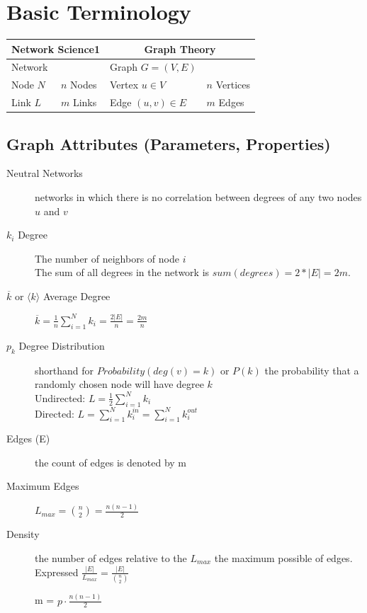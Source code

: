 \documentclass[../main.tex]{subfiles}
\begin{document}
\section{Basic Terminology}
\begin{table}
\centering

\begin{tabular}{|l|l|l|l|}
\hline
\multicolumn{2}{|c|}{\textbf{Network Science1}}& \multicolumn{2}{|c|}{\textbf{Graph Theory}}\\
\hline

\hline
Network  && Graph $G = (V, E)$ &\\
\hline
Node $N$ &$n$ Nodes& Vertex $u \in V$ &$n$ Vertices\\
\hline
Link $L$ &$m$ Links& Edge $(u, v) \in E$  &$m$ Edges\\
\hline

\end{tabular}

\end{table}




\subsection{Graph Attributes (Parameters, Properties)}
\begin{description}
    \item [Neutral Networks] networks in which there is no correlation between degrees of any two nodes $u$ and $v$
    \item[$k_i$ Degree] The number of neighbors of node $i$\\ The sum of all degrees in the network is $sum(degrees)=2*|E|=2m$.
    \item[$\overline{k} $ or $\langle k\rangle$ Average Degree]  $\overline{k}= \frac{1}{n}\sum\limits_{i = 1}^N {k_i } =\frac{2|E|}{n}=\frac{2m}{n}$
    \item[$p_k$ Degree Distribution] shorthand for $Probability (deg(v) = k)$ or $P(k)$ the probability that a randomly chosen node will have degree $k$ \\
    Undirected:             $L = \frac{1}{2}\sum\limits_{i = 1}^N {k_i }$ \\
    Directed: $L = \sum\limits_{i = 1}^N {k_i^{in} }  = \sum\limits_{i = 1}^N {k_i^{out} }$
    \item [Edges (E)]the count of edges is denoted by m
    \item[Maximum Edges]  $L_{max}={\binom{n}{2}}=\frac{n(n-1)}{2}$
    \item [Density] the number of edges relative to the $L_{max}$ the maximum possible of edges. Expressed $\frac{|E|}{L_{max}} =  \frac{|E|}{\binom{n}{2}}$

m = $p\cdot\frac{n(n-1)}{2}$
\end{description}
\end{document}
